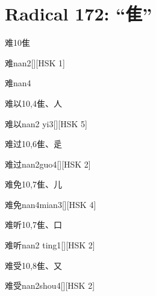 
\section*{Radical 172: ``⾫''}

\begin{entry}{难}{10}{⾫}
  \begin{phonetics}{难}{nan2}[][HSK 1]
  \end{phonetics}
  \begin{phonetics}{难}{nan4}
  \end{phonetics}
\end{entry}

\begin{entry}{难以}{10,4}{⾫、⼈}
  \begin{phonetics}{难以}{nan2 yi3}[][HSK 5]
  \end{phonetics}
\end{entry}

\begin{entry}{难过}{10,6}{⾫、⾡}
  \begin{phonetics}{难过}{nan2guo4}[][HSK 2]
  \end{phonetics}
\end{entry}

\begin{entry}{难免}{10,7}{⾫、⼉}
  \begin{phonetics}{难免}{nan4mian3}[][HSK 4]
  \end{phonetics}
\end{entry}

\begin{entry}{难听}{10,7}{⾫、⼝}
  \begin{phonetics}{难听}{nan2 ting1}[][HSK 2]
  \end{phonetics}
\end{entry}

\begin{entry}{难受}{10,8}{⾫、⼜}
  \begin{phonetics}{难受}{nan2shou4}[][HSK 2]
  \end{phonetics}
\end{entry}

